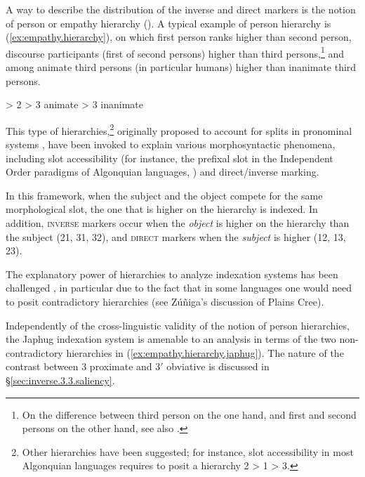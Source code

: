 A way to describe the distribution of the inverse and direct markers is the notion of person or empathy hierarchy (\citealt{silverstein76, delancey81direction, jackson02rentongdengdi, lockwood12hierarchies}). A typical example of person hierarchy is (\ref{ex:empathy.hierarchy}),  on which first person ranks higher than second person, discourse participants (first of second persons) higher than third persons,\footnote{On the difference between third person on the one hand, and first and second persons on the other hand, see also \citet[253--256]{benveniste66problemes1}.} and among  animate third persons (in particular humans) higher than inanimate third persons.

\begin{exe}
\ex \label{ex:empathy.hierarchy}
 > 2 > 3 animate > 3 inanimate
\end{exe}

This type of hierarchies,\footnote{Other hierarchies have been suggested; for instance, slot accessibility in most Algonquian languages requires to posit a hierarchy 2 > 1 > 3. } originally proposed to account for splits in pronominal systems \citep{silverstein76}, have been invoked to explain various morphosyntactic phenomena, including slot accessibility (for instance, the prefixal slot in the Independent Order paradigms of Algonquian languages, \citealt{zuniga06, lockwood12hierarchies}) and direct/inverse marking.

In this framework, when the subject and the object compete for the same morphological slot, the one that is higher on the hierarchy is indexed. In addition, \textsc{inverse} markers occur when the \textit{object} is higher on the hierarchy than the subject (2\fl{}1, 3\fl{}1, 3\fl{}2), and \textsc{direct} markers when the \textit{subject} is higher (1\fl{}2, 1\fl{}3, 2\fl{}3). 

The explanatory power of hierarchies to analyze indexation systems has been challenged \citep{zuniga18hierarchies}, in particular due to the fact that in some languages one would need to posit contradictory hierarchies (see Zúñiga's \citeyear{zuniga06} discussion of Plains Cree).

Independently of the cross-linguistic validity of the notion of person hierarchies, the Japhug indexation system is amenable to an analysis in terms of the two non-contradictory hierarchies in (\ref{ex:empathy.hierarchy.japhug}). The nature of the contrast between 3 proximate and 3$'$ obviative is discussed in §\ref{sec:inverse.3.3.saliency}.

